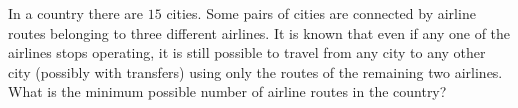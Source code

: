 In a country there are $15$ cities. Some pairs of cities are connected by airline routes belonging to three different airlines. It is known that even if any one of the airlines stops operating, it is still possible to travel from any city to any other city (possibly with transfers) using only the routes of the remaining two airlines. What is the minimum possible number of airline routes in the country?
